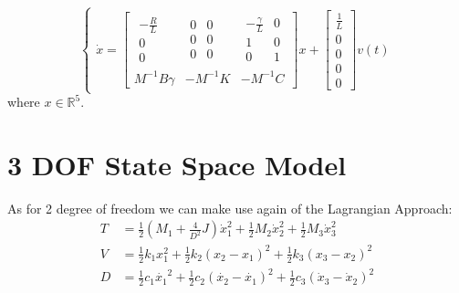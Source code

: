 \begin{equation}
\begin{cases}
\dot{x}=
\left[ \begin{array} { c|c|c  } 
                \begin{array}{c} 
               -\frac{R}{L} \\ 
                0 \\
                0 
                \end{array} &
                \begin{array}{cc} 
               0 & 0 \\ 
                0 & 0 \\
                0  & 0 
                \end{array}&
                \begin{array}{cc} 
               -\frac{\gamma}{L} & 0 \\ 
                1 & 0 \\
                0  & 1 
                \end{array} \\
                \hline 
                M^{-1}B\gamma& -M^{-1}K & -M^{-1}C
\end{array} \right] 
x+\begin{bmatrix}\frac{1}{L} \\ 0 \\ 0 \\ 0 \\ 0\end{bmatrix}v(t)
\end{cases}
\end{equation}
where $x \in \mathbb{R}^5$.

\section{3 DOF State Space Model}
As for 2 degree of freedom we can make use again of the Lagrangian Approach:
\begin{align*}
T &= \frac{1}{2} (M_1 + \frac{4}{D^2}J)\dot{x}_1^2+\frac{1}{2}M_2\dot{x}_2^2 + \frac{1}{2}M_3 \dot{x}_3^2 \\
V &= \frac{1}{2}k_1x_1^2 + \frac{1}{2}k_2(x_2-x_1)^2 +\frac{1}{2}k_3 (x_3-x_2)^2\\
D &= \frac{1}{2}c_1\dot{x_1}^2 + \frac{1}{2}c_2(\dot{x_2}-\dot{x_1})^2 +\frac{1}{2}c_3(\dot{x}_3-\dot{x}_2)^2
\end{align*}

